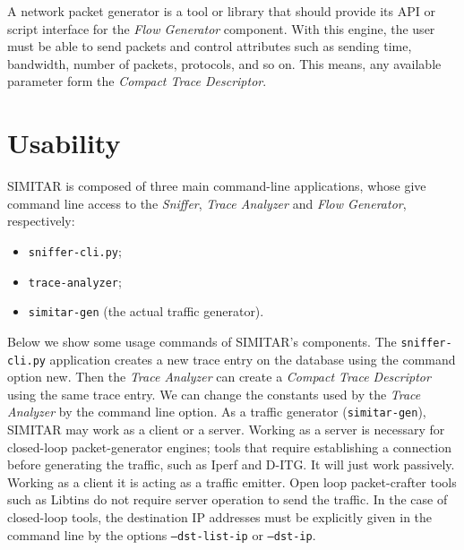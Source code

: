 A network packet generator is a tool or library that should provide its API or script interface for the \textit{Flow Generator} component. With this engine, the user must be able to send packets and control attributes such as sending time, bandwidth, number of packets, protocols, and so on. This means, any available parameter form the \textit{Compact Trace Descriptor}.


\section{Usability}


SIMITAR is composed of three main command-line applications, whose give command line access to the \textit{Sniffer}, \textit{Trace Analyzer} and \textit{Flow Generator}, respectively:
\begin{itemize}
\item \texttt{sniffer-cli.py};
\item \texttt{trace-analyzer};
\item \texttt{simitar-gen} (the actual traffic generator). 
\end{itemize}

Below we show some usage commands of SIMITAR’s components. The \texttt{sniffer-cli.py} application creates a new trace entry on the database using the command option new. Then the \textit{Trace Analyzer} can create a \textit{Compact Trace Descriptor} using the same trace entry. We can change the constants used by the \textit{Trace Analyzer} by the command line option. As a traffic generator (\texttt{simitar-gen}), SIMITAR may work as a client or a server. Working as a server is necessary for closed-loop packet-generator engines; tools that require establishing a connection before generating the traffic, such as Iperf and D-ITG. It will just work passively. Working as a client it is acting as a traffic emitter. Open loop packet-crafter tools such as Libtins do not require server operation to send the traffic. In the case of closed-loop tools, the destination IP addresses must be explicitly given in the command line by the options \texttt{--dst-list-ip} or \texttt{--dst-ip}.


